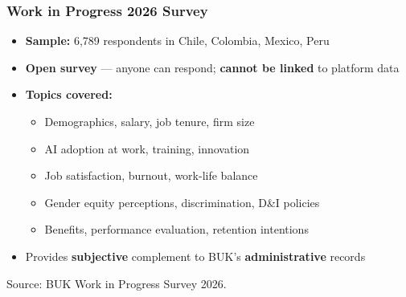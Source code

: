\documentclass[aspectratio=169, 11pt]{beamer}
\begin{document}
\begin{frame}[label=survey]
\frametitle{Work in Progress 2026 Survey}

\begin{itemize}
    \item \textbf{Sample:} 6,789 respondents in Chile, Colombia, Mexico, Peru
    \item \textbf{Open survey} --- anyone can respond; \textbf{cannot be linked} to platform data
    \item \textbf{Topics covered:}
    \begin{itemize}
        \item Demographics, salary, job tenure, firm size
        \item AI adoption at work, training, innovation
        \item Job satisfaction, burnout, work-life balance
        \item Gender equity perceptions, discrimination, D\&I policies
        \item Benefits, performance evaluation, retention intentions
    \end{itemize}
    \item Provides \textbf{subjective} complement to BUK's \textbf{administrative} records
\end{itemize}

\vfill
{\scriptsize\textcolor{muted}{Source: BUK Work in Progress Survey 2026.}}
\hfill\hyperlink{bukslide}{}

\end{frame}
\end{document}

